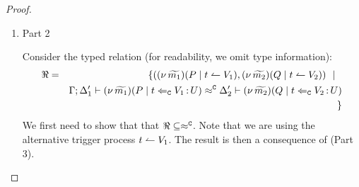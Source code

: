 \begin{proof}
\begin{enumerate}
\begin{enumerate}
\begin{eqnarray}
								\label{proof:trig_equiv22}
							\end{eqnarray}
							and
							{\hwb}
							{\Delta_2''}{}
							{proof:trig_equiv33}
							The freshness of $t$ allows us to mimic the transitions
							in \eqref{proof:trig_equiv22} to get that for $\Delta_4$
							\begin{eqnarray*}
								\begin{array}{crll}
									& \Gamma; \es; \Delta_2' & \proves &		
									\newsp{\widetilde{m_2}}{Q \Par \ftrigger{t}{V_2}{U}}
									\\
									\Hby{} &&&
									\newsp{\widetilde{m_2}}{Q_2 \Par \ftrigger{t}{V_2}{U}}
									\\
									{\hby{\bactinp{t}{m}}}& & &
									\newsp{\widetilde{m_2}}{Q_2 \Par \newsp{s}{\binp{s}{y} \mapchar{U}{y} \Par \bout{\dual{s}}{V_2} \inact}}
									\\
									\Hby{} & \Delta_4 & \proves & Q'
								\end{array}
							\end{eqnarray*}
							The conclusion is immediate from \eqref{proof:trig_equiv33}.


				\item The action comes from the interaction of $P$ and $\htrigger{t}{V_1}$: This case is not possible, due to the freshness of $t$.
				\end{enumerate}


		\item	Part 2 

				\noi Consider the typed relation (for readability, we omit type information):
				\begin{eqnarray*}
					\Re	&=&		\{	((\nu\, \widetilde{m_1})(P \;|\; t \leftharpoonup V_1),
										(\nu\, \widetilde{m_2})(Q \;|\; t \leftharpoonup V_2))
								\ \ |\ \ \\
						&&			\Gamma; \Delta_1' \vdash (\nu\, \widetilde{m_1})(P \;|\; t \Leftarrow_{\mathtt{C}} V_1{\,:\,}U) \approx^\mathtt{C} \Delta_2' \vdash (\nu\, \widetilde{m_2})(Q \;|\; t \Leftarrow_{\mathtt{C}} V_2{\,:\,}U)
						\\
						&&		\}
				\end{eqnarray*}
				We first need to show that that $\Re \subseteq \approx^\mathtt{C}$.
				Note that we are using the alternative trigger process $t \leftharpoonup V_1$.
				The result is then a consequence of  (Part 3).


\end{enumerate}
\end{proof}
